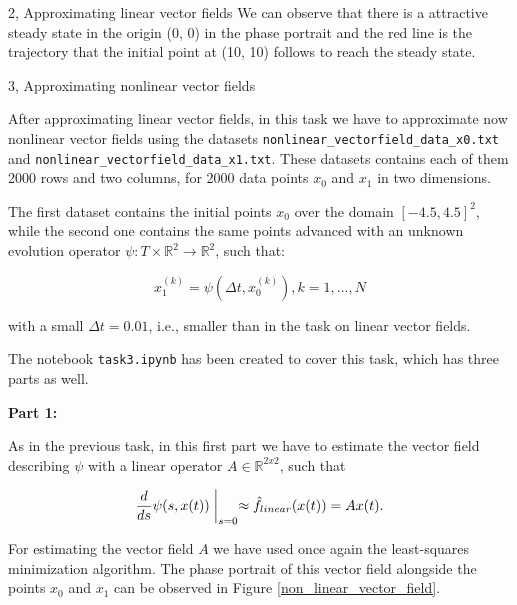\documentclass[10pt,a4paper]{article}
\begin{document}
\begin{task}{2, Approximating linear vector fields}
We can observe that there is a attractive steady state in the origin (0, 0) in the phase portrait and the red line is the trajectory that the initial point at (10, 10) follows to reach the steady state.

\end{task}

\newpage

\begin{task}{3, Approximating nonlinear vector fields}

After approximating linear vector fields, in this task we have to approximate now nonlinear vector fields using the datasets \texttt{nonlinear\_vectorfield\_data\_x0.txt} and \texttt{nonlinear\_vectorfield\_data\_x1.txt}. These datasets contains each of them 2000 rows and two columns, for 2000 data points $x_0$ and $x_1$ in two dimensions.

The first dataset contains the initial points $x_{0}$ over the domain $[-4.5, 4.5]^{2}$, while the second one contains the same points advanced with an unknown evolution operator $\psi : T \times \mathbb{R} ^ {2} \rightarrow \mathbb{R} ^ {2}$, such that:

\begin{equation}\label{psi}
    x^{(k)}_{1} = \psi (\Delta t, x^{(k)}_{0}),   k = 1,...,N
\end{equation}
 
\noindent with a small $\Delta t = 0.01$, i.e., smaller than in the task on linear vector fields.

The notebook \texttt{task3.ipynb} has been created to cover this task, which has three parts as well.

\bigskip

\noindent \textbf{Part 1:} 

As in the previous task, in this first part we have to estimate the vector field describing $\psi$ with a linear operator $A \in \mathbb{R} ^ {2x2}$, such that 

\begin{equation}\label{linearoperator}
    \frac{d}{ds} \psi(s, x(t)) \biggm| _{s = 0} \approx \hat{f}_{linear}(x(t)) = Ax(t).
\end{equation}

For estimating the vector field $A$ we have used once again the least-squares minimization algorithm. The phase portrait of this vector field alongside the points $x_0$ and $x_1$ can be observed in Figure \ref{non_linear_vector_field}.


\end{task}
\end{document}
